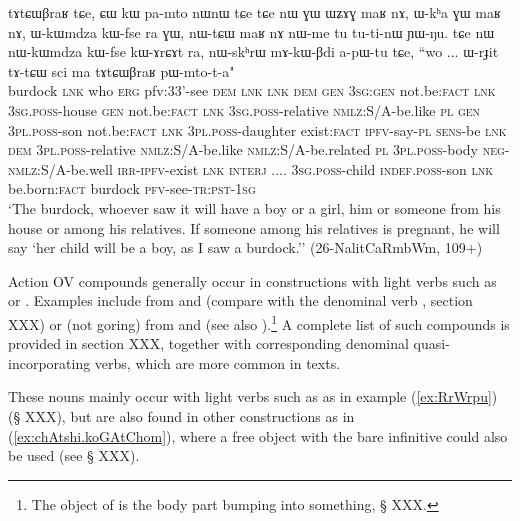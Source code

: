 \begin{exe}
\ex \label{ex:tAtCWBraR}
\gll tɤtɕɯβraʁ tɕe, ɕɯ kɯ pa-mto nɯnɯ tɕe tɕe nɯ ɣɯ ɯʑɤɣ maʁ nɤ, ɯ-kʰa ɣɯ maʁ nɤ,  ɯ-kɯmdza kɯ-fse ra ɣɯ, nɯ-tɕɯ maʁ nɤ nɯ-me tu tu-ti-nɯ ɲɯ-ŋu. tɕe nɯ nɯ-kɯmdza kɯ-fse kɯ-ɤrɕɤt ra, nɯ-skʰrɯ mɤ-kɯ-βdi a-pɯ-tu tɕe, ``wo ... ɯ-rɟit tɤ-tɕɯ sci ma tɤtɕɯβraʁ pɯ-mto-t-a" \\
burdock \textsc{lnk} who \textsc{erg}  pfv:3\fl{}3'-see \textsc{dem} \textsc{lnk} \textsc{lnk} \textsc{dem} \textsc{gen} \textsc{3sg:gen} not.be:\textsc{fact} \textsc{lnk} \textsc{3sg.poss}-house \textsc{gen} not.be:\textsc{fact} \textsc{lnk}  \textsc{3sg.poss}-relative \textsc{nmlz}:S/A-be.like \textsc{pl} \textsc{gen} \textsc{3pl.poss}-son not.be:\textsc{fact} \textsc{lnk} \textsc{3pl.poss}-daughter exist:\textsc{fact} \textsc{ipfv}-say-\textsc{pl} \textsc{sens}-be \textsc{lnk} \textsc{dem} \textsc{3pl.poss}-relative  \textsc{nmlz}:S/A-be.like  \textsc{nmlz}:S/A-be.related \textsc{pl}  \textsc{3pl.poss}-body  \textsc{neg}-\textsc{nmlz}:S/A-be.well \textsc{irr}-\textsc{ipfv}-exist \textsc{lnk} \textsc{interj} .... \textsc{3sg.poss}-child \textsc{indef.poss}-son \textsc{lnk} be.born:\textsc{fact} burdock \textsc{pfv}-see-\textsc{tr:pst}-\textsc{1sg} \\
\glt `The burdock, whoever saw it will have a boy or a girl, him or someone from his house or among his relatives. If someone among his relatives is pregnant, he will say `her child will be a boy, as I saw a burdock.'' (26-NalitCaRmbWm, 109+)
\end{exe}

Action OV compounds generally occur in constructions with light verbs such as  or . Examples include  from  and  (compare with the denominal verb  , section XXX) or  (not goring) from  and   (see also ).\footnote{The object of  is the body part bumping into something, § XXX.} A complete list of such compounds is provided in section XXX, together with corresponding denominal quasi-incorporating verbs, which are more common in texts. 

These nouns mainly occur with light verbs such as  as in example (\ref{ex:RrWrpu}) (§ XXX), but are also found in other constructions as in (\ref{ex:chAtshi.koGAtChom}), where a free object  with the bare infinitive  could also be used (see § XXX).


